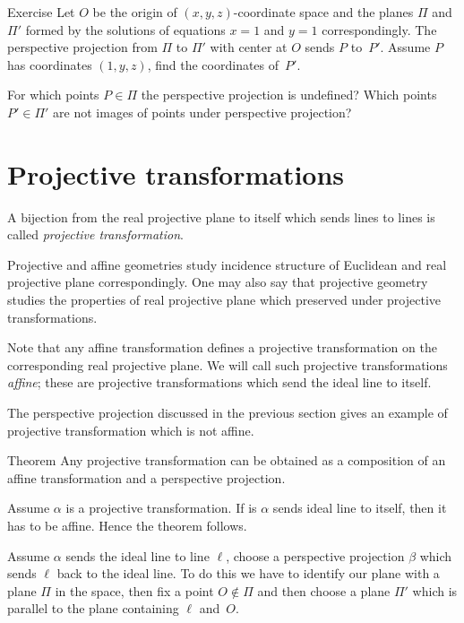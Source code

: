 \begin{thm}{Exercise}\label{ex:persect}
Let $O$ be the origin of $(x,y,z)$-coordinate space
and the planes $\Pi$ and $\Pi'$ formed by the solutions of equations
$x=1$ and $y=1$ correspondingly.
The perspective projection from $\Pi$ to $\Pi'$ with center at $O$ sends $P$ to~$P'$.
Assume $P$ has coordinates $(1,y,z)$, find the coordinates of~$P'$.

For which points $P\in \Pi$ the perspective projection is undefined?
Which points $P'\in\Pi'$ are not images of points under perspective projection?
\end{thm}

\section*{Projective transformations}

A bijection from the real projective plane to itself 
which sends lines to lines 
is called \emph{projective transformation}.

Projective and affine geometries study incidence structure of Euclidean and real projective plane correspondingly.
One may also say that
projective geometry studies the properties of real projective plane which preserved under projective transformations.


Note that any affine transformation defines  a projective transformation on the corresponding real projective plane.
We will call such projective transformations \emph{affine}; 
these are projective transformations which send the ideal line to itself.

The perspective projection discussed in the previous section 
gives an example of projective transformation which is not affine.

\begin{thm}{Theorem}
Any projective transformation can be obtained as a composition of an affine transformation and a perspective projection.
\end{thm}

Assume $\alpha$ is a projective transformation. 
If is $\alpha$ sends ideal line to itself,
then it has to be affine. 
Hence the theorem follows.

Assume $\alpha$ sends the ideal line to line $\ell$, choose a perspective projection $\beta$ which sends $\ell$ back to the ideal line.
To do this we have to identify our plane with a plane $\Pi$ in the space, 
then fix a point $O\notin \Pi$  
and then choose a plane $\Pi'$ which is
parallel to the plane containing $\ell$ and~$O$.

